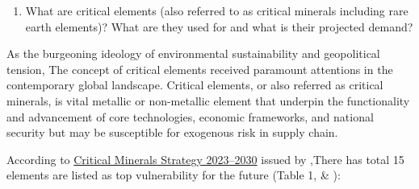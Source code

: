 \documentclass[preprint, 3p,
authoryear]{elsarticle} %
\providecommand{\tightlist}{%
  \setlength{\itemsep}{0pt}\setlength{\parskip}{0pt}}
\begin{document}
\begin{enumerate}
\def\labelenumi{\arabic{enumi}.}
\tightlist
\item
  What are critical elements (also referred to as critical minerals
  including rare earth elements)? What are they used for and what is
  their projected demand?
\end{enumerate}

As the burgeoning ideology of environmental sustainability and
geopolitical tension, The concept of critical elements received
paramount attentions in the contemporary global landscape. Critical
elements, or also referred as critical minerals, is vital metallic or
non-metallic element that underpin the functionality and advancement of
core technologies, economic frameworks, and national security but may be
susceptible for exogenous risk in supply chain.

According to
\href{https://www.industry.gov.au/publications/critical-minerals-strategy-2023-2030}{Critical
Minerals Strategy 2023--2030} issued by \citet{geoscience2023},There has
total 15 elements are listed as top vulnerability for the future (Table
1, \citet{Coyne2023} \& \citet{Skirrow2013} ):
\end{document}

